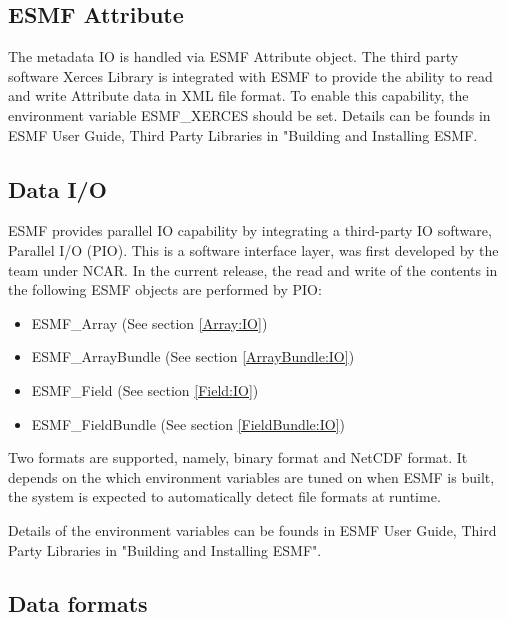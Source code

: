 \subsection{ESMF Attribute}

The metadata IO is handled via ESMF Attribute object. The third
party software Xerces Library is integrated with ESMF to provide
the ability to read and write Attribute data in XML file format.
To enable this capability, the environment variable ESMF\_XERCES should be
set. Details can be founds in ESMF User Guide, Third Party Libraries
in "Building and Installing ESMF.


\subsection{Data I/O}

ESMF provides parallel IO capability by integrating a third-party IO
software, Parallel I/O (PIO). This is a software interface layer, was 
first developed by the team under 
NCAR. In the current release, the read and write of the
contents in the following ESMF objects are performed by PIO:

\begin{description}
\begin{itemize}
\item ESMF\_Array  (See section \ref{Array:IO})
\item ESMF\_ArrayBundle  (See section \ref{ArrayBundle:IO})
\item ESMF\_Field  (See section \ref{Field:IO})
\item ESMF\_FieldBundle  (See section \ref{FieldBundle:IO})
\end{itemize}
\end{description}

Two formats are supported, namely, binary format and NetCDF format.  
It depends on the which environment variables are tuned on when ESMF is built,
the system is expected to automatically detect file formats at runtime.

Details of the environment variables can be founds in ESMF User Guide, 
Third Party Libraries in "Building and Installing ESMF".



\subsection{Data formats}

